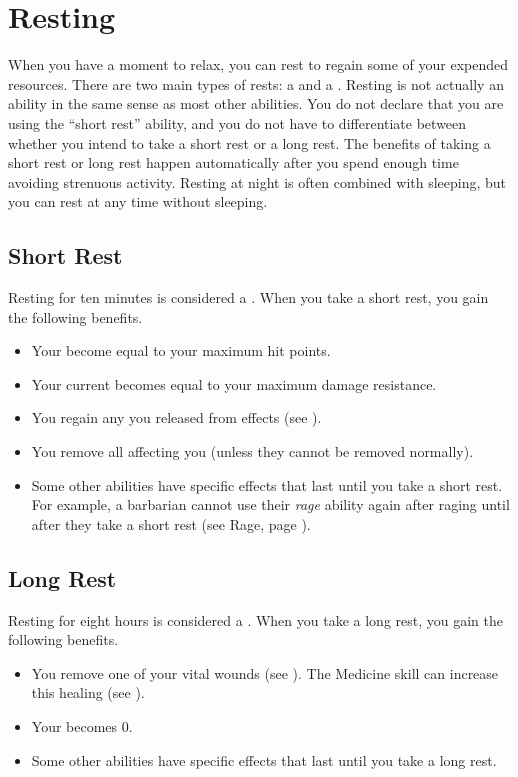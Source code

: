 \section{Resting}\label{Resting}
    When you have a moment to relax, you can rest to regain some of your expended resources.
    There are two main types of rests: a  and a .
    Resting is not actually an ability in the same sense as most other abilities.
    You do not declare that you are using the ``short rest'' ability, and you do not have to differentiate between whether you intend to take a short rest or a long rest.
    The benefits of taking a short rest or long rest happen automatically after you spend enough time avoiding strenuous activity.
    Resting at night is often combined with sleeping, but you can rest at any time without sleeping.


    \subsection{Short Rest}\label{Short Rest}
        Resting for ten minutes is considered a .
        When you take a short rest, you gain the following benefits.
        \begin{itemize}
            \item Your  become equal to your maximum hit points.
            \item Your current  becomes equal to your maximum damage resistance.
            \item You regain any  you released from  effects (see ).
            \item You remove all  affecting you (unless they cannot be removed normally).
            \item Some other abilities have specific effects that last until you take a short rest.
                For example, a barbarian cannot use their \textit{rage} ability again after raging until after they take a short rest (see Rage, page ).
        \end{itemize}

    \subsection{Long Rest}\label{Long Rest}
        Resting for eight hours is considered a .
        When you take a long rest, you gain the following benefits.
        \begin{itemize}
            \item You remove one of your vital wounds (see ).
                The Medicine skill can increase this healing (see ).
            \item Your  becomes 0.
            \item Some other abilities have specific effects that last until you take a long rest.
        \end{itemize}

